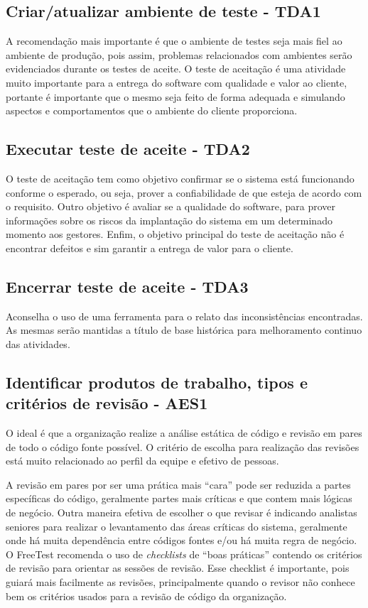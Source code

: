 \subsection{Criar/atualizar ambiente de teste - TDA1}
\label{sec:guiatda1}

A recomendação mais importante é que o ambiente de testes seja mais fiel ao ambiente de produção, pois assim, problemas relacionados com ambientes serão evidenciados durante os testes de aceite. O teste de aceitação é uma atividade muito importante para a entrega do software com qualidade e valor ao cliente, portante é importante que o mesmo seja feito de forma adequada e simulando aspectos e comportamentos que o ambiente do cliente proporciona.

\subsection{Executar teste de aceite - TDA2}
\label{sec:guiatda2}

O teste de aceitação tem como objetivo confirmar se o sistema está funcionando conforme o esperado, ou seja, prover a confiabilidade de que esteja de acordo com o requisito. Outro objetivo é avaliar se a qualidade do software, para prover informações sobre os riscos da implantação do sistema em um determinado momento aos gestores. Enfim, o objetivo principal do teste de aceitação não é encontrar defeitos e sim garantir a entrega de valor para o cliente.

\subsection{Encerrar teste de aceite - TDA3}
\label{sec:guiatda3}

Aconselha o uso de uma ferramenta para o relato das inconsistências encontradas. As mesmas serão mantidas a título de base histórica para melhoramento continuo das atividades.

\subsection{Identificar produtos de trabalho, tipos e critérios de revisão - AES1}
\label{sec:guiaaes1}

O ideal é que a organização realize a análise estática de código e revisão em pares de todo o código fonte possível. O critério de escolha para realização das revisões está muito relacionado ao perfil da equipe e efetivo de pessoas.

A revisão em pares por ser uma prática mais “cara” pode ser reduzida a partes específicas do código, geralmente partes mais críticas e que contem mais lógicas de negócio. Outra maneira efetiva de escolher o que revisar é indicando analistas seniores para realizar o levantamento das áreas críticas do sistema, geralmente onde há muita dependência entre códigos fontes e/ou há muita regra de negócio. O FreeTest recomenda o uso de \textit{checklists} de “boas práticas” contendo os critérios de revisão para orientar as sessões de revisão. Esse checklist é importante, pois guiará mais facilmente as revisões, principalmente quando o revisor não conhece bem os critérios usados para a revisão de código da organização.

